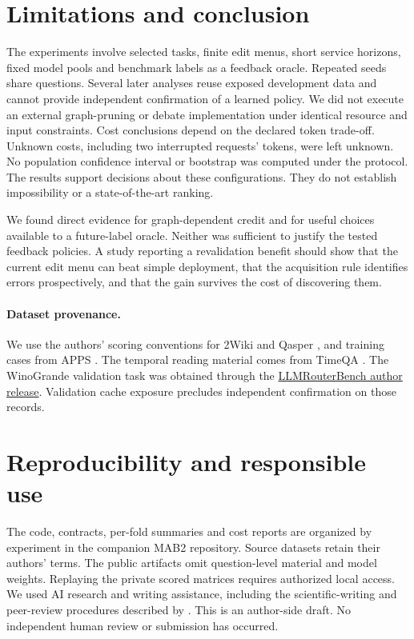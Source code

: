 \documentclass[11pt]{article}
\begin{document}
\section{Limitations and conclusion}
The experiments involve selected tasks, finite edit menus, short service horizons, fixed model pools and benchmark labels as a feedback oracle. Repeated seeds share questions. Several later analyses reuse exposed development data and cannot provide independent confirmation of a learned policy. We did not execute an external graph-pruning or debate implementation under identical resource and input constraints. Cost conclusions depend on the declared token trade-off. Unknown costs, including two interrupted requests' tokens, were left unknown. No population confidence interval or bootstrap was computed under the protocol. The results support decisions about these configurations. They do not establish impossibility or a state-of-the-art ranking.

We found direct evidence for graph-dependent credit and for useful choices available to a future-label oracle. Neither was sufficient to justify the tested feedback policies. A study reporting a revalidation benefit should show that the current edit menu can beat simple deployment, that the acquisition rule identifies errors prospectively, and that the gain survives the cost of discovering them.

\paragraph{Dataset provenance.} We use the authors' scoring conventions for 2Wiki \citep{twowiki} and Qasper \citep{qasper}, and training cases from APPS \citep{apps}. The temporal reading material comes from TimeQA \citep{timeqa}. The WinoGrande validation task \citep{wino} was obtained through the \href{https://github.com/ynulihao/LLMRouterBench}{LLMRouterBench author release}. Validation cache exposure precludes independent confirmation on those records.

\section*{Reproducibility and responsible use}
The code, contracts, per-fold summaries and cost reports are organized by experiment in the companion MAB2 repository. Source datasets retain their authors' terms. The public artifacts omit question-level material and model weights. Replaying the private scored matrices requires authorized local access. We used AI research and writing assistance, including the scientific-writing and peer-review procedures described by \citet{skills}. This is an author-side draft. No independent human review or submission has occurred.
\end{document}
